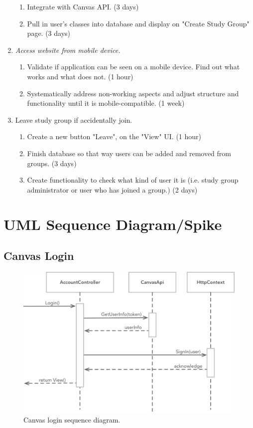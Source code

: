 \documentclass[12pt,letterpaper]{article}
\begin{document}
\begin{enumerate}
	\begin{enumerate}
	\item Integrate with Canvas API. (3 days)
    \item Pull in user's classes into database and display on "Create Study Group" page. (3 days)
	\end{enumerate}
\item \textit{Access website from mobile device.}
	\begin{enumerate}
	\item Validate if application can be seen on a mobile device. Find out what works and what does not. (1 hour)
    \item Systematically address non-working aspects and adjust structure and functionality until it is mobile-compatible. (1 week)
	\end{enumerate}
\item Leave study group if accidentally join.
	\begin{enumerate}
	\item Create a new button "Leave", on the "View" UI. (1 hour)
    \item Finish database so that way users can be added and removed from groups. (3 days)
    \item Create functionality to check what kind of user it is (i.e. study group administrator or user who has joined a group.) (2 days)
    
	\end{enumerate}
\end{enumerate}

\clearpage
\section{UML Sequence Diagram/Spike}
\subsection{Canvas Login}
\begin{figure}[!htb]
  \includegraphics[width=\linewidth]{CanvasSigninUML.png}
  \caption{Canvas login sequence diagram.}
  \label{canvas_login}
\end{figure}
\clearpage
\end{document}
